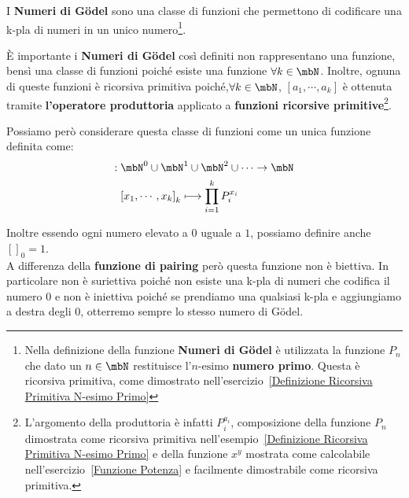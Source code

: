 I \textbf{Numeri di Gödel} sono una classe di funzioni che permettono di codificare una k-pla di numeri in un unico numero\footnote{Nella definizione della funzione \textbf{Numeri di Gödel} è utilizzata la funzione \(P_n\) che dato un \(n\in\mbN\) restituisce l'\(n\text{-esimo}\) \textbf{numero primo}. Questa è ricorsiva primitiva, come dimostrato nell'esercizio~\ref{Definizione Ricorsiva Primitiva N-esimo Primo}}.

È importante i \textbf{Numeri di Gödel} così definiti non rappresentano una funzione, bensì una classe di funzioni poiché esiste una funzione \(\forall k \in \mbN\). Inoltre, ognuna di queste funzioni è ricorsiva primitiva poiché,\( \forall k \in \mbN\), \([a_1,\cdots,a_k]\) è ottenuta tramite \textbf{l'operatore produttoria} applicato a \textbf{funzioni ricorsive primitive}\footnote{L'argomento della produttoria è infatti \(P_i^{a_i}\), composizione della funzione \(P_n\) dimostrata come ricorsiva primitiva nell'esempio~\ref{Definizione Ricorsiva Primitiva N-esimo Primo} e della funzione \(x^y\) mostrata come calcolabile nell'esercizio~\ref{Funzione Potenza} e facilmente dimostrabile come ricorsiva primitiva.}.

Possiamo però considerare questa classe di funzioni come un unica funzione definita come:
\begin{equation}
  \begin{split}
  []: \;&\mbN^0\cup\mbN^1\cup\mbN^2\cup\cdots\rightarrow\mbN\\
  &{[x_1,\cdots,x_k]}_k \longmapsto  \prod_{i=1}^k P_i^{x_i}\\
  \end{split}
\end{equation}

Inoltre essendo ogni numero elevato a \(0\) uguale a \(1\), possiamo definire anche \({[]}_0=1\).\\
A differenza della \textbf{funzione di pairing} però questa funzione non è biettiva. In particolare non è suriettiva poiché non esiste una k-pla di numeri che codifica il numero \(0\) e non è iniettiva poiché se prendiamo una qualsiasi k-pla e aggiungiamo a destra degli \(0\), otterremo sempre lo stesso numero di Gödel.

